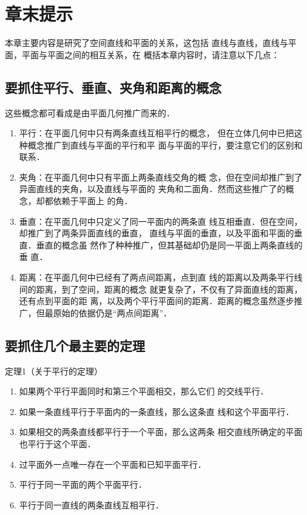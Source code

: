 \section{章末提示}

本章主要内容是研究了空间直线和平面的关系，这包括
直线与直线，直线与平面，平面与平面之间的相互关系，在
概括本章内容时，请注意以下几点：

\subsection{要抓住平行、垂直、夹角和距离的概念}

这些概念都可看成是由平面几何推广而来的．
\begin{enumerate}
\item 平行：在平面几何中只有两条直线互相平行的概念，
但在立体几何中已把这种概念推广到直线与平面的平行和平
面与平面的平行，要注意它们的区别和联系．
\item 夹角：在平面几何中只有平面上两条直线交角的概
念，但在空间却推广到了异面直线的夹角，以及直线与平面的
夹角和二面角．然而这些推广了的概念，却都依赖于平面上
的角．
\item 垂直：在平面几何中只定义了同一平面内的两条直
线互相垂直．但在空间，却推广到了两条异面直线的垂直，
直线与平面的垂直，以及平面和平面的垂直．垂直的概念虽
然作了种种推广，但其基础却仍是同一平面上两条直线的垂
直．
\item 距离：在平面几何中已经有了两点间距离，点到直
线的距离以及两条平行线间的距离，到了空间，距离的概念
就更复杂了，不仅有了异面直线的距离，还有点到平面的距
离，以及两个平行平面间的距离．距离的概念虽然逐步推
广，但最原始的依据仍是“两点间距离”．
\end{enumerate}

\subsection{要抓住几个最主要的定理}
\begin{blk}
    {定理1（关于平行的定理）}
\begin{enumerate}
\item 如果两个平行平面同时和第三个平面相交，那么它们
的交线平行．
\item 如果一条直线平行于平面内的一条直线，那么这条直
线和这个平面平行．
\item 如果相交的两条直线都平行于一个平面，那么这两条
相交直线所确定的平面也平行于这个平面．
\item 过平面外一点唯一存在一个平面和已知平面平行．
\item 平行于同一平面的两个平面平行．
\item 平行于同一直线的两条直线互相平行．
\end{enumerate}
\end{blk}




